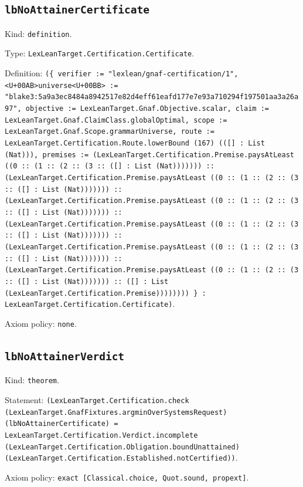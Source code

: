 \documentclass[11pt]{article}
\begin{document}
\subsection*{\texttt{lbNoAttainerCertificate}}
\noindent Kind: \texttt{definition}.\par
\noindent Type: \texttt{LexLeanTarget.Certification.Certificate}.\par
\noindent Definition: \texttt{(\{ verifier := "lexlean/gnaf-certification/1", <U+00AB>universe<U+00BB> := "blake3:5a9a3ec8484a8942517e82d4eff61eafd177e7e93a710294f197501aa3a26a97", objective := LexLeanTarget.Gnaf.Objective.scalar, claim := LexLeanTarget.Gnaf.ClaimClass.globalOptimal, scope := LexLeanTarget.Gnaf.Scope.grammarUniverse, route := LexLeanTarget.Certification.Route.lowerBound (167) (([] : List (Nat))), premises := (LexLeanTarget.Certification.Premise.paysAtLeast ((0 :: (1 :: (2 :: (3 :: ([] : List (Nat))))))) :: (LexLeanTarget.Certification.Premise.paysAtLeast ((0 :: (1 :: (2 :: (3 :: ([] : List (Nat))))))) :: (LexLeanTarget.Certification.Premise.paysAtLeast ((0 :: (1 :: (2 :: (3 :: ([] : List (Nat))))))) :: (LexLeanTarget.Certification.Premise.paysAtLeast ((0 :: (1 :: (2 :: (3 :: ([] : List (Nat))))))) :: (LexLeanTarget.Certification.Premise.paysAtLeast ((0 :: (1 :: (2 :: (3 :: ([] : List (Nat))))))) :: (LexLeanTarget.Certification.Premise.paysAtLeast ((0 :: (1 :: (2 :: (3 :: ([] : List (Nat))))))) :: ([] : List (LexLeanTarget.Certification.Premise)))))))) \} : LexLeanTarget.Certification.Certificate)}.\par
\noindent Axiom policy: \texttt{none}.\par
\subsection*{\texttt{lbNoAttainerVerdict}}
\noindent Kind: \texttt{theorem}.\par
\noindent Statement: \texttt{(LexLeanTarget.Certification.check (LexLeanTarget.GnafFixtures.argminOverSystemsRequest) (lbNoAttainerCertificate) = LexLeanTarget.Certification.Verdict.incomplete (LexLeanTarget.Certification.Obligation.boundUnattained) (LexLeanTarget.Certification.Established.notCertified))}.\par
\noindent Axiom policy: \texttt{exact [Classical.choice, Quot.sound, propext]}.\par
\end{document}
